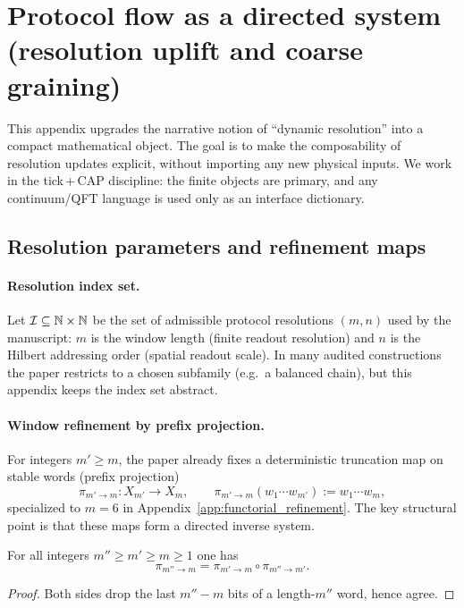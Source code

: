 \section{Protocol flow as a directed system (resolution uplift and coarse graining)}
\label{app:protocol_flow_directed_system}

This appendix upgrades the narrative notion of ``dynamic resolution'' into a compact mathematical object.
The goal is to make the composability of resolution updates explicit, without importing any new physical inputs.
We work in the tick\,+\,CAP discipline: the finite objects are primary, and any continuum/QFT language is used only as an interface dictionary.

\subsection{Resolution parameters and refinement maps}

\paragraph{Resolution index set.}
Let $\mathcal{I}\subseteq \mathbb{N}\times \mathbb{N}$ be the set of admissible protocol resolutions $(m,n)$ used by the manuscript:
$m$ is the window length (finite readout resolution) and $n$ is the Hilbert addressing order (spatial readout scale).
In many audited constructions the paper restricts to a chosen subfamily (e.g.\ a balanced chain), but this appendix keeps the index set abstract.

\paragraph{Window refinement by prefix projection.}
For integers $m'\ge m$, the paper already fixes a deterministic truncation map on stable words (prefix projection)
\[
\pi_{m'\to m}:X_{m'}\to X_m,
\qquad
\pi_{m'\to m}(w_1\cdots w_{m'}) := w_1\cdots w_m,
\]
specialized to $m=6$ in Appendix~\ref{app:functorial_refinement}.
The key structural point is that these maps form a directed inverse system.

\begin{lemma}\label{lem:prefix_projection_functoriality}
\MathTag For all integers $m''\ge m'\ge m\ge 1$ one has
\[
\pi_{m''\to m}=\pi_{m'\to m}\circ \pi_{m''\to m'}.
\]
\end{lemma}
\begin{proof}
Both sides drop the last $m''-m$ bits of a length-$m''$ word, hence agree.
\end{proof}

